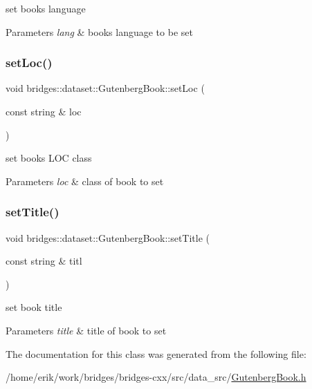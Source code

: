 set book\textquotesingle{}s language 
\begin{DoxyParams}{Parameters}
{\em lang} & book\textquotesingle{}s language to be set \\
\hline
\end{DoxyParams}
\mbox{\label{classbridges_1_1dataset_1_1_gutenberg_book_a6e729741b6fba636257edee0b2f4452d}} 
\subsubsection{\texorpdfstring{set\+Loc()}{setLoc()}}
{\footnotesize\ttfamily void bridges\+::dataset\+::\+Gutenberg\+Book\+::set\+Loc (\begin{DoxyParamCaption}\item[{const string \&}]{loc }\end{DoxyParamCaption})\hspace{0.3cm}{\ttfamily [inline]}}

set book\textquotesingle{}s L\+OC class 
\begin{DoxyParams}{Parameters}
{\em loc} & class of book to set \\
\hline
\end{DoxyParams}
\mbox{\label{classbridges_1_1dataset_1_1_gutenberg_book_a2e42d04fa20f8cc0bfbe7213e68f7779}} 
\subsubsection{\texorpdfstring{set\+Title()}{setTitle()}}
{\footnotesize\ttfamily void bridges\+::dataset\+::\+Gutenberg\+Book\+::set\+Title (\begin{DoxyParamCaption}\item[{const string \&}]{titl }\end{DoxyParamCaption})\hspace{0.3cm}{\ttfamily [inline]}}

set book title 
\begin{DoxyParams}{Parameters}
{\em title} & title of book to set \\
\hline
\end{DoxyParams}


The documentation for this class was generated from the following file\+:\begin{DoxyCompactItemize}
\item 
/home/erik/work/bridges/bridges-\/cxx/src/data\+\_\+src/\hyperlink{_gutenberg_book_8h}{Gutenberg\+Book.\+h}\end{DoxyCompactItemize}
